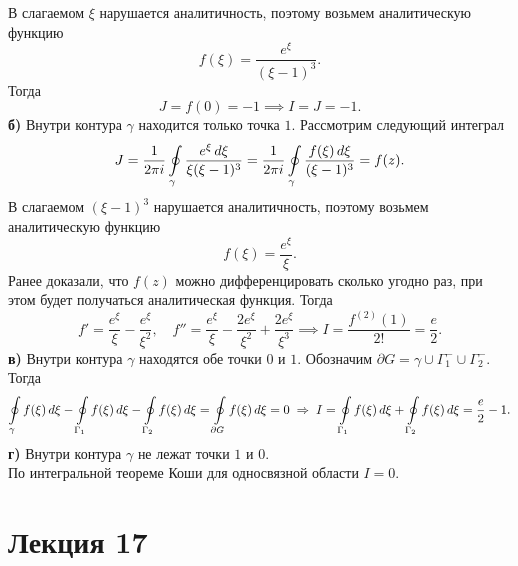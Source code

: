 	В слагаемом $\xi$ нарушается аналитичность, поэтому возьмем аналитическую функцию
	\[ f(\xi) = \frac{e^\xi}{(\xi-1)^3}. \]
	Тогда
	\[ J = f(0) = -1 \implies I = J = -1. \]
	\textbf{б)} Внутри контура $\gamma$ находится только точка $1$. Рассмотрим следующий интеграл
	\[ J = \frac{1}{2\pi i} \oint\limits_\gamma \frac{e^\xi\,d\xi}{\xi(\xi-1)^3} = \frac{1}{2\pi i} \oint\limits_\gamma \frac{f(\xi)\,d\xi}{(\xi-1)^3} = f(z). \]
	В слагаемом $(\xi-1)^3$  нарушается аналитичность, поэтому возьмем аналитическую функцию
	\[ f(\xi) = \frac{e^\xi}{\xi}. \]
	Ранее доказали, что $f(z)$ можно дифференцировать сколько угодно раз, при этом будет получаться аналитическая функция. Тогда
	\[ f' = \frac{e^\xi}{\xi} - \frac{e^\xi}{\xi^2},\quad f'' = \frac{e^\xi}{\xi} - \frac{2e^\xi}{\xi^2} + \frac{2e^\xi}{\xi^3}\implies I = \frac{f^{(2)}(1)}{2!} = \frac{e}{2}. \]
	\textbf{в)} Внутри контура $\gamma$ находятся обе точки $0$ и $1$. Обозначим $\partial G = \gamma\cup\Gamma_1^-\cup\Gamma_2^-$. Тогда
	\[ \oint\limits_\gamma f(\xi)\,d\xi - \oint\limits_{\Gamma_1}f(\xi)\,d\xi - \oint\limits_{\Gamma_2}f(\xi)\,d\xi = \oint\limits_{\partial G}f(\xi)\,d\xi = 0\;\Rightarrow\; I = \oint\limits_{\Gamma_1}f(\xi)\,d\xi + \oint\limits_{\Gamma_2}f(\xi)\,d\xi = \frac{e}{2} - 1.\]
	\textbf{г)} Внутри контура $\gamma$ не лежат точки $1$ и $0$.\\
	По интегральной теореме Коши для односвязной области $I = 0$.
	\newpage
	\section{Лекция 17}
